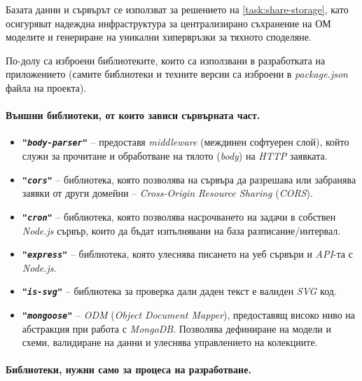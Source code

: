 Базата данни и сървърът се използват за решението на \ref{task:share-storage}, като осигуряват надеждна инфраструктура за централизирано съхранение на ОМ моделите и генериране на уникални хипервръзки за тяхното споделяне.

По-долу са изброени библиотеките, които са използвани в разработката на приложението (самите библиотеки и техните версии са изброени в \textit{package.json} файла на проекта).

\paragraph{Външни библиотеки, от които зависи сървърната част.}

\begin{itemize}
	\item \texttt{\textbf{"\textit{body-parser}"}} -- предоставя \textit{middleware} (междинен софтуерен слой), който служи за прочитане и обработване на тялото (\textit{body}) на \textit{HTTP} заявката.
	
	\item \texttt{\textbf{"\textit{cors}"}} -- библиотека, която позволява на сървъра да разрешава или забранява заявки от други домейни -- \textit{Cross-Origin Resource Sharing} (\textit{CORS}).
	
	\item \texttt{\textbf{"\textit{cron}"}} -- библиотека, която позволява насрочването на задачи в собствен \textit{Node.js} сървър, които да бъдат изпълнявани на база разписание/интервал.
	
	\item \texttt{\textbf{"\textit{express}"}} -- библиотека, която улеснява писането на уеб сървъри и \textit{API}-та с \textit{Node.js}.
	
	\item \texttt{\textbf{"\textit{is-svg}"}} -- библиотека за проверка дали даден текст е валиден \textit{SVG} код.
	
	\item \texttt{\textbf{"\textit{mongoose}"}} -- \textit{ODM} (\textit{Object Document Mapper}), предоставящ високо ниво на абстракция при работа с \textit{MongoDB}. Позволява дефиниране на модели и схеми, валидиране на данни и улеснява управлението на колекциите.

\end{itemize}

\paragraph{Библиотеки, нужни само за процеса на разработване.}
~\\
\vspace{-0.85cm}

